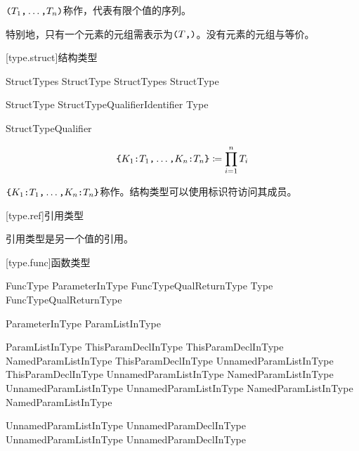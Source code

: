 \pnum
$\texttt{(}T_1\texttt{,} \ldots\texttt{,} T_n\texttt{)}$称作，代表有限个值的序列。

\pnum
特别地，只有一个元素的元组需表示为$\texttt{(}T\texttt{,)}$。没有元素的元组与等价。

[type.struct]{结构类型}

\begin{bnf}{StructTypes}
    StructType \br
    StructTypes \terminal{,} StructType
\end{bnf}

\begin{bnf}{StructType}
    StructTypeQualifier\bnfs Identifier \terminal{:} Type
\end{bnf}

\begin{bnf}{StructTypeQualifier}
\end{bnf}

$$ \texttt{\{} K_1\texttt{:}T_1\texttt{,} \ldots\texttt{,} K_n\texttt{:}T_n \texttt{\}} \coloneqq \prod^n_{i=1} T_i $$

\pnum
$\texttt{\{}K_1\texttt{:}T_1\texttt{,} \ldots\texttt{,} K_n\texttt{:}T_n\texttt{\}}$称作。结构类型可以使用标识符访问其成员。

[type.ref]{引用类型}

\pnum
引用类型是另一个值的引用。

[type.func]{函数类型}

\begin{bnf}{FuncType}
    ParameterInType FuncTypeQual\bnfs ReturnType \br
    Type FuncTypeQual\bnfs ReturnType
\end{bnf}

\begin{bnf}{ParameterInType}
    \terminal{(} ParamListInType\bnfq \terminal{)}
\end{bnf}

\begin{bnf}{ParamListInType}
    ThisParamDeclInType \br
    ThisParamDeclInType \terminal{,} NamedParamListInType \br
    ThisParamDeclInType \terminal{,} UnnamedParamListInType \br
    ThisParamDeclInType \terminal{,} UnnamedParamListInType \terminal{,} NamedParamListInType \br
    UnnamedParamListInType \br
    UnnamedParamListInType \terminal{,} NamedParamListInType \br
    NamedParamListInType
\end{bnf}

\begin{bnf}{UnnamedParamListInType}
    UnnamedParamDeclInType \br
    UnnamedParamListInType \terminal{,} UnnamedParamDeclInType
\end{bnf}

